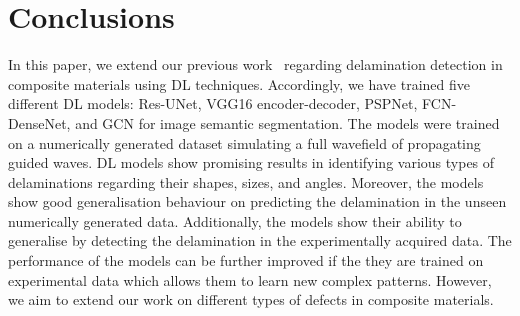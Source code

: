 \section{Conclusions}
\label{conclusion}
In this paper, we extend our previous work~\cite{Ijjeh2021} regarding delamination detection in composite materials using DL techniques. 
Accordingly, we have trained five different DL models: Res-UNet, VGG16 encoder-decoder, PSPNet, FCN-DenseNet, and GCN for image semantic segmentation.
The models were trained on a numerically generated dataset simulating a full wavefield of propagating guided waves.
DL models show promising results in identifying various types of delaminations regarding their shapes, sizes, and angles. 
Moreover, the models show good generalisation behaviour on predicting the delamination in the unseen numerically generated data.
Additionally, the models show their ability to generalise by detecting the delamination in the experimentally acquired data.
The performance of the models can be further improved if the they are trained on experimental data which allows them to learn new complex patterns.
However, we aim to extend our work on different types of defects in composite materials.
